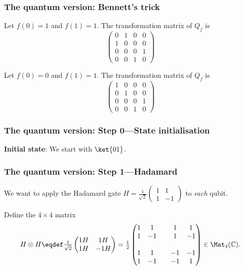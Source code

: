 \documentclass[aspectratio=169, 12pt, final, professionalfont]{beamer}
\begin{document}
\begin{frame}\frametitle{The quantum version: Bennett's trick}
  Let \(f(0) = 1\) and \(f(1) = 1\).
  The transformation matrix of \(Q_{f}\) is
  \begin{equation*}
    \begin{pmatrix}
      0 & 1 & 0 & 0 \\
      1 & 0 & 0 & 0 \\
      0 & 0 & 0 & 1 \\
      0 & 0 & 1 & 0
    \end{pmatrix}
  \end{equation*}

  Let \(f(0) = 0\) and \(f(1) = 1\).
  The transformation matrix of \(Q_{f}\) is
  \begin{equation*}
    \begin{pmatrix}
      1 & 0 & 0 & 0 \\
      0 & 1 & 0 & 0 \\
      0 & 0 & 0 & 1 \\
      0 & 0 & 1 & 0
    \end{pmatrix}
  \end{equation*}
\end{frame}

\begin{frame}\frametitle{The quantum version: Step 0---State initialisation}
  \textbf{Initial state}: We start with \(\ket{01}\).
\end{frame}

\begin{frame}\frametitle{The quantum version: Step 1---Hadamard}
  We want to apply the Hadamard gate \(H =
  \frac{1}{\sqrt{2}}\begin{pmatrix}
    1 & 1 \\
    1 & -1
  \end{pmatrix}
  \)
  to \emph{each} qubit.

  Define the \(4\times 4\) matrix
  \begin{equation*}
    H\otimes H \eqdef \tfrac{1}{\sqrt{2}}
    \begin{pmatrix}
      1 H & 1 H \\
      1 H & -1 H
    \end{pmatrix}
    =
    \tfrac{1}{2}
    \begin{pmatrix}
      1 & 1 & & 1 & 1 \\
      1 & -1 & & 1 & -1 \\\\
      1 & 1 & & -1 & -1 \\
      1 & -1 & & -1 & 1
    \end{pmatrix} \in \Mat_{4}( \mathbb{C}).
  \end{equation*}
\end{frame}
\end{document}
